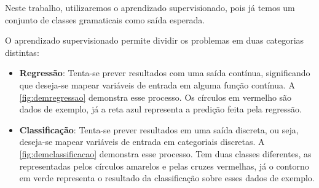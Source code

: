 Neste trabalho, utilizaremos o aprendizado supervisionado, pois já temos um conjunto de classes gramaticais como saída esperada.

O aprendizado supervisionado permite dividir os problemas em duas categorias distintas:


\begin{itemize}
	\item \textbf{Regressão}: Tenta-se prever resultados com uma saída contínua, significando que deseja-se mapear variáveis de entrada em alguma função contínua. A \autoref{fig:demregressao} demonstra esse processo. Os círculos em vermelho são dados de exemplo, já a reta azul representa a predição feita pela regressão.
	\item \textbf{Classificação}:  Tenta-se prever resultados em uma saída discreta, ou seja, deseja-se mapear variáveis de entrada em categoriais discretas. A \autoref{fig:demclassificacao} demonstra esse processo. Tem duas classes diferentes, as representadas pelos círculos amarelos e pelas cruzes vermelhas, já o contorno em verde representa o resultado da classificação sobre esses dados de exemplo.
\end{itemize}



